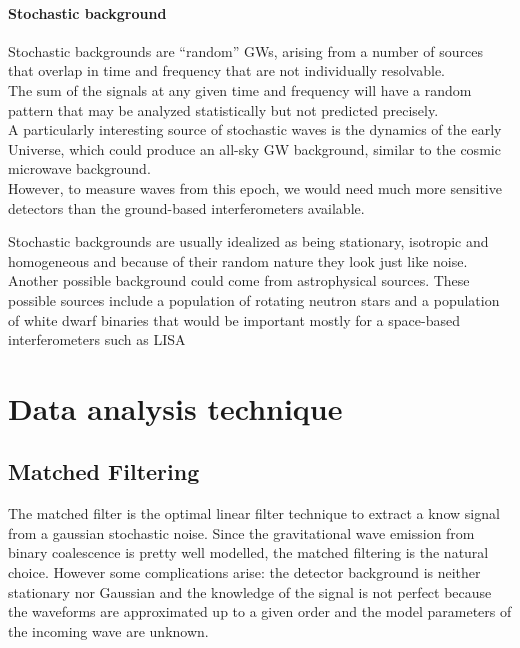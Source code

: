 \documentclass[binding=0.6cm, LaM]{sapthesis}
\begin{document}
\subsubsection{Stochastic background}

	Stochastic backgrounds are “random” GWs, 
	arising from a  number of sources that overlap 
	in time and frequency that are not individually resolvable. \\

	The sum of the signals at any given time and frequency will have 
	a random pattern that may be analyzed statistically but not predicted precisely. \\
	A particularly interesting source of stochastic waves is the dynamics of the early Universe, 
	which could produce an all-sky GW background, 
	similar to the cosmic microwave background. \\
	However, to measure waves from this epoch, 
	we would need much more sensitive detectors than the ground-based interferometers available.
	
	Stochastic backgrounds are usually idealized as being stationary, 
	isotropic and homogeneous and because of their random nature they look just like noise.	\\
	Another possible background could come from astrophysical sources. 
	These possible sources include a population of rotating neutron stars 
	and a population of white dwarf binaries that would be important mostly for a space-based interferometers such as LISA 

\chapter{Data analysis technique}

\section{Matched Filtering}
	
	The matched filter is the optimal linear filter technique to extract a know signal from a gaussian stochastic noise. 
	Since the gravitational wave emission from binary coalescence is pretty well modelled, 
	the matched filtering is the natural choice. However some complications arise: 
	the detector background is neither stationary nor Gaussian and the knowledge of the signal 
	is not perfect because the waveforms are approximated up to a given order 	
	and the model parameters of the incoming wave are unknown. 
	
\end{document}
